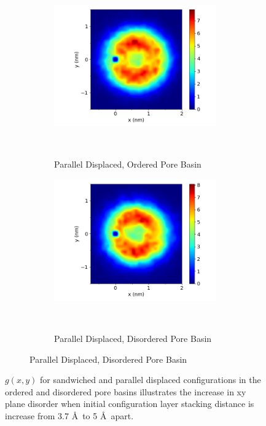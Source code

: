 \documentclass[journal=jpcbfk,manusciprt=article]{achemso}
\begin{document}
\begin{figure}
\begin{subfigure}{1\linewidth}
\begin{subfigure}{0.47\linewidth}
       \end{subfigure}
       \begin{subfigure}{0.47\linewidth}
                \centering
                \includegraphics[width=\linewidth]{offset_xy_correlation.png}
                \caption{Parallel Displaced, Ordered Pore Basin}~\label{fig:offset_xy}
        \end{subfigure}
        \begin{subfigure}{0.47\linewidth}
                \centering
                \includegraphics[width=\linewidth]{disorder_offset_xy_correlation.png}
                \caption{Parallel Displaced, Disordered Pore Basin}~\label{fig:disorder_offset_xy_correlation}
        \end{subfigure}
  \end{subfigure}
  \caption{$g(x,y)$ for sandwiched and parallel displaced configurations in the
	  ordered and disordered pore basins illustrates the increase in xy plane
	  disorder when initial configuration layer stacking distance is increase from
	  3.7 \AA~to 5 \AA~apart.}\label{fig:xy_correlation}
  \end{figure}
\end{document}

